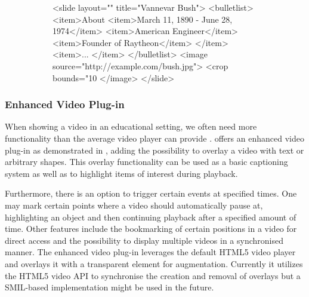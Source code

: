      \begin{figure}[h!]
      \begin{subfigure}{0.53\textwidth}
       \vspace{-1em}
       \begin{lstxml*}
<slide layout="" title="Vannevar Bush">
 <bulletlist>
  <item>About
   <item>March 11, 1890 - June 28, 1974</item>
   <item>American Engineer</item>
   <item>Founder of Raytheon</item>
  </item>
  <item>...
  </item>
 </bulletlist>
 <image source="http://example.com/bush.jpg">
  <crop bounds="10%
 </image>
</slide>
       \end{lstxml*}
      \end{subfigure}
      \hfill
      \begin{subfigure}{0.43\textwidth}
      \end{subfigure}
      \renewcommand{\figurename}{Listing}
      \renewcommand{\figureshortname}{Lst.}
     \end{figure}

    \subsubsection{Enhanced Video Plug-in}

     When showing a video in an educational setting, we often need more
     functionality than the average video player can provide
     \citep{reuss-1}. \mxp offers an enhanced video plug-in as demonstrated in
     , adding the possibility to overlay a video with text
     or arbitrary shapes. This overlay functionality can be used as a basic
     captioning system as well as to highlight items of interest during
     playback.

     Furthermore, there is an option to trigger certain events at specified
     times. One may mark certain points where a video should automatically
     pause at, highlighting an object and then continuing playback after a
     specified amount of time. Other features include the bookmarking of
     certain positions in a video for direct access and the possibility to
     display multiple videos in a synchronised manner. The enhanced video
     plug-in leverages the default HTML5 video player and overlays it with a
     transparent  element for augmentation. Currently it utilizes the
     HTML5 video API to synchronise the creation and removal of overlays but a
     SMIL-based implementation might be used in the future.

